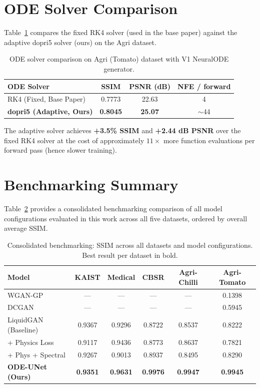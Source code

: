 \section{ODE Solver Comparison}

Table~\ref{tab:ode} compares the fixed RK4 solver (used in the base paper) against the adaptive dopri5 solver (ours) on the Agri dataset.

\begin{table}[htbp]
\centering
\caption{ODE solver comparison on Agri (Tomato) dataset with V1 NeuralODE generator.}
\label{tab:ode}
\begin{tabular}{lccc}
\toprule
\textbf{ODE Solver} & \textbf{SSIM} & \textbf{PSNR (dB)} & \textbf{NFE / forward} \\
\midrule
RK4 (Fixed, Base Paper) & 0.7773 & 22.63 & 4 \\
\textbf{dopri5 (Adaptive, Ours)} & \textbf{0.8045} & \textbf{25.07} & $\sim$44 \\
\bottomrule
\end{tabular}
\end{table}

The adaptive solver achieves \textbf{+3.5\% SSIM} and \textbf{+2.44 dB PSNR} over the fixed RK4 solver at the cost of approximately $11\times$ more function evaluations per forward pass (hence slower training).

\section{Benchmarking Summary}

Table~\ref{tab:benchmark} provides a consolidated benchmarking comparison of all model configurations evaluated in this work across all five datasets, ordered by overall average SSIM.

\begin{table}[htbp]
\centering
\caption{Consolidated benchmarking: SSIM across all datasets and model configurations. Best result per dataset in bold.}
\label{tab:benchmark}
\begin{tabular}{lccccc}
\toprule
\textbf{Model} & \textbf{KAIST} & \textbf{Medical} & \textbf{CBSR} & \textbf{Agri-Chilli} & \textbf{Agri-Tomato} \\
\midrule
WGAN-GP              & ---    & ---    & ---    & ---    & 0.1398 \\
DCGAN                & ---    & ---    & ---    & ---    & 0.5945 \\
LiquidGAN (Baseline) & 0.9367 & 0.9296 & 0.8722 & 0.8537 & 0.8222 \\
+ Physics Loss       & 0.9117 & 0.9436 & 0.8773 & 0.8637 & 0.7821 \\
+ Phys + Spectral    & 0.9267 & 0.9013 & 0.8937 & 0.8495 & 0.8290 \\
\textbf{ODE-UNet (Ours)} & \textbf{0.9351} & \textbf{0.9631} & \textbf{0.9976} & \textbf{0.9947} & \textbf{0.9945} \\
\bottomrule
\end{tabular}
\end{table}

